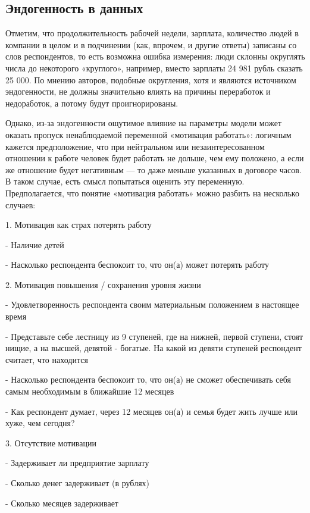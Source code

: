 \documentclass[12pt, a4paper]{article}
\begin{document}
{\subsection{Эндогенность в данных}

Отметим, что продолжительность рабочей недели, зарплата, количество людей в компании в целом и в подчинении (как, впрочем, и другие ответы) записаны со слов респондентов, то есть возможна ошибка измерения: люди склонны округлять числа до некоторого «круглого», например, вместо зарплаты 24 981 рубль сказать 25 000. По мнению авторов, подобные округления, хотя и являются источником эндогенности, не должны значительно влиять на причины переработок и недоработок, а потому будут проигнорированы. 

Однако, из-за эндогенности ощутимое влияние на параметры модели может оказать пропуск ненаблюдаемой переменной «мотивация работать»: логичным кажется предположение, что при нейтральном или незаинтересованном отношении к работе человек будет работать не дольше, чем ему положено, а если же отношение будет негативным — то даже меньше указанных в договоре часов. В таком случае, есть смысл попытаться оценить эту переменную. Предполагается, что понятие «мотивация работать» можно разбить на несколько случаев:

1.  Мотивация как страх потерять работу

    -   Наличие детей

    -   Насколько респондента беспокоит то, что он(а) может потерять работу

2.  Мотивация повышения / сохранения уровня жизни

    -   Удовлетворенность респондента своим материальным положением в настоящее время

    -   Представьте себе лестницу из 9 ступеней, где на нижней, первой ступени, стоят нищие, а на высшей, девятой - богатые. На какой из девяти ступеней респондент считает, что находится

    -   Насколько респондента беспокоит то, что он(а) не сможет обеспечивать себя самым необходимым в ближайшие 12 месяцев

    -   Как респондент думает, через 12 месяцев он(а) и семья будет жить лучше или хуже, чем сегодня?

3.  Отсутствие мотивации

    -   Задерживает ли предприятие зарплату

    -   Сколько денег задерживает (в рублях)

    -   Сколько месяцев задерживает

}
\end{document}
